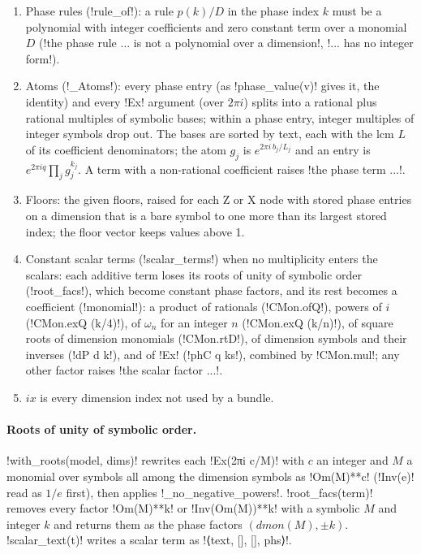 {{{\begin{algorithm}
\begin{enumerate}
this raises \lexcode!a family whose nodes' legs differ in dimension!.
\item Phase rules (\lexpy!rule_of!): a rule $p(k)/D$ in the phase index $k$ must be a polynomial
with integer coefficients and zero constant term over a monomial $D$
(\lexcode!the phase rule ... is not a polynomial over a dimension!,
\lexcode!... has no integer form!).
\item Atoms (\lexpy!_Atoms!): every phase entry (as \lexpy!phase_value(v)! gives it, the identity) and
every \lexpy!Ex! argument (over $2\pi i$) splits into a rational plus rational multiples of
symbolic bases; within a phase entry, integer multiples of integer symbols drop out. The bases
are sorted by text, each with the lcm $L$ of its coefficient denominators; the atom $g_j$ is
$e^{2\pi i\, b_j/L_j}$ and an entry is $e^{2\pi i q}\prod_j g_j^{k_j}$. A term with a
non-rational coefficient raises \lexcode!the phase term ...!.
\item Floors: the given floors, raised for each Z or X node with stored phase entries on a
dimension that is a bare symbol to one more than its largest stored index; the floor vector
keeps values above 1.
\item Constant scalar terms (\lexpy!scalar_terms!) when no multiplicity enters the scalars: each
additive term loses its roots of unity of symbolic order (\lexpy!root_facs!), which become
constant phase factors, and its rest becomes a coefficient (\lexpy!monomial!): a product of
rationals (\lexlean!CMon.ofQ!), powers of $i$ (\lexlean!CMon.exQ (k/4)!), of $\omega_n$ for an integer
$n$ (\lexlean!CMon.exQ (k/n)!), of square roots of dimension monomials (\lexlean!CMon.rtD!), of
dimension symbols and their inverses (\lexlean!dP d k!), and of \lexpy!Ex! (\lexlean!phC q ks!), combined
by \lexlean!CMon.mul!; any other factor raises \lexcode!the scalar factor ...!.
\item $ix$ is every dimension index not used by a bundle.
\end{enumerate}
\end{algorithm}

\paragraph{Roots of unity of symbolic order.} \lexpy!with_roots(model, dims)! rewrites each
\lexpy!Ex(2πi c/M)! with $c$ an integer and $M$ a monomial over symbols all among the dimension
symbols as \lexpy!Om(M)**c! (\lexpy!Inv(e)! read as $1/e$ first), then applies
\lexpy!_no_negative_powers!. \lexpy!root_facs(term)! removes every factor \lexpy!Om(M)**k! or
\lexpy!Inv(Om(M))**k! with a symbolic $M$ and integer $k$ and returns them as the phase factors
$(\mathit{dmon}(M), \pm k)$. \lexpy!scalar_text(t)! writes a scalar term as
\lexlean!⟨text, [], [], phs⟩!.

}}}
